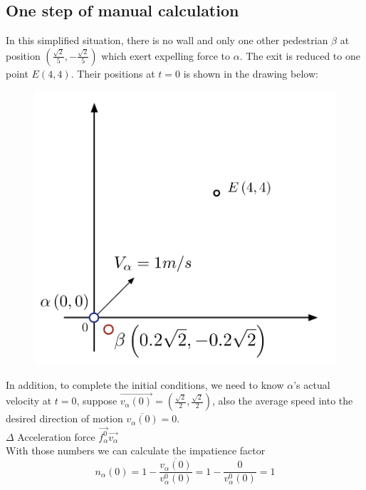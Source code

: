 \subsection{One step of manual calculation}

In this simplified situation, there is no wall and only one other pedestrian $\beta$ at position $(\frac{\sqrt{2}}{5}, -\frac{\sqrt{2}}{5})$ which exert expelling force to $\alpha$.  The exit is reduced to one point $E(4,4)$.  Their positions at $t=0$ is shown in the drawing below:\\

\begin{figure}
\centering
{\includegraphics[scale=0.45]{Figures/calculation.pdf}} 
\caption{\small{}\label{calc}}
\end{figure}

In addition, to complete the initial conditions, we need to know $\alpha$'s actual velocity at $t=0$, suppose $\overrightarrow{v_{\alpha}(0)}=(\frac{\sqrt{2}}{2}, \frac{\sqrt{2}}{2})$, also the average speed into the desired direction of motion $\overline{v_{\alpha}(0)}=0$.\\

$\Delta$ Acceleration force  
$\overrightarrow{f^{0}_{\alpha}}\overrightarrow{v_{\alpha}} $\\

With those numbers we can calculate the impatience factor 
 \begin{equation}
 n_{\alpha}(0)=1-\frac{\overline{v_{\alpha}(0)}}{v^{0}_{\alpha}(0)}=1-\dfrac{0}{v^{0}_{\alpha}(0)}=1
 \end{equation}

